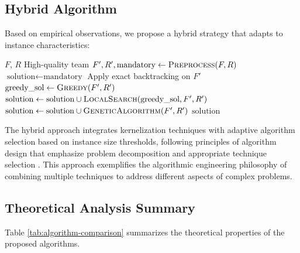 \documentclass[12pt,a4paper]{article}
\begin{document}
\subsection{Hybrid Algorithm}
\label{subsec:hybrid-algorithm}

Based on empirical observations, we propose a hybrid strategy that adapts to instance characteristics:

\begin{algorithm}[H]
	\caption{Adaptive Hybrid Algorithm}
	\label{alg:hybrid}
	\begin{algorithmic}[1]
		\Require $F$, $R$
		\Ensure High-quality team
		\State $F', R', \text{mandatory} \gets \Call{Preprocess}{F, R}$
		\State $\text{solution} \gets \text{mandatory}$
		\State Apply exact backtracking on $F'$
		\State $\text{greedy\_sol} \gets \Call{Greedy}{F', R'}$
		\State $\text{solution} \gets \text{solution} \cup \Call{LocalSearch}{\text{greedy\_sol}, F', R'}$
		\Else
		\State $\text{solution} \gets \text{solution} \cup \Call{GeneticAlgorithm}{F', R'}$
		\EndIf
		\State \Return $\text{solution}$
	\end{algorithmic}
\end{algorithm}

The hybrid approach integrates kernelization techniques with adaptive algorithm selection based on instance size thresholds, following principles of algorithm design that emphasize problem decomposition and appropriate technique selection \cite{kleinberg}. This approach exemplifies the algorithmic engineering philosophy of combining multiple techniques to address different aspects of complex problems.

\subsection{Theoretical Analysis Summary}
\label{subsec:theoretical-analysis}

Table \ref{tab:algorithm-comparison} summarizes the theoretical properties of the proposed algorithms.
\end{document}
